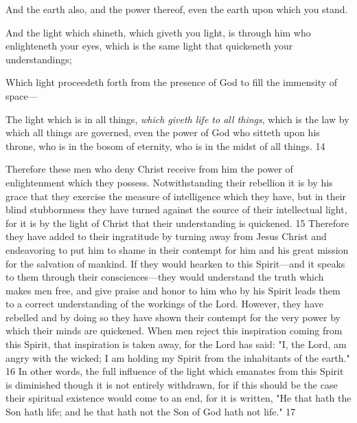 And the earth also, and the power thereof, even the earth upon which you stand.

And the light which shineth, which giveth you light, is through him who enlighteneth your
eyes, which is the same light that quickeneth your understandings;

Which light proceedeth forth from the presence of God to fill the immensity of space—

The light which is in all things, \textit{which giveth life to all things}, which is the law by which all
things are governed, even the power of God who sitteth upon his throne, who is in the bosom
of eternity, who is in the midst of all things. 14

Therefore these men who deny Christ receive from him the power of enlightenment which
they possess. Notwithstanding their rebellion it is by his grace that they exercise the measure
of intelligence which they have, but in their blind stubbornness they have turned against the
source of their intellectual light, for it is by the light of Christ that their understanding is
quickened. 15 Therefore they have added to their ingratitude by turning away from Jesus
Christ and endeavoring to put him to shame in their contempt for him and his great mission
for the salvation of mankind. If they would hearken to this Spirit—and it speaks to them
through their consciences—they would understand the truth which makes men free, and give
praise and honor to him who by his Spirit leads them to a correct understanding of the
workings of the Lord. However, they have rebelled and by doing so they have shown their
contempt for the very power by which their minds are quickened. When men reject this
inspiration coming from this Spirit, that inspiration is taken away, for the Lord has said: "I,
the Lord, am angry with the wicked; I am holding my Spirit from the inhabitants of the
earth." 16 In other words, the full influence of the light which emanates from this Spirit is
diminished though it is not entirely withdrawn, for if this should be the case their spiritual
existence would come to an end, for it is written, "He that hath the Son hath life; and he that
hath not the Son of God hath not life." 17

